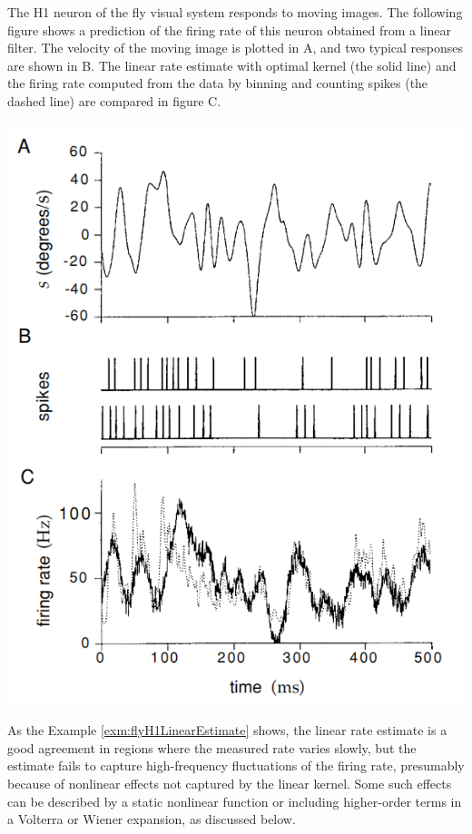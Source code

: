 \begin{exm}
  \label{exm:flyH1LinearEstimate}
  The H1 neuron of the fly visual system responds to moving images. The following figure shows a prediction of the firing rate of this neuron obtained from a linear filter. The velocity of the moving image is plotted in A, and two typical responses are shown in B. The linear rate estimate with optimal kernel (the solid line) and the firing rate computed from the data by binning and counting spikes (the dashed line) are compared in figure C.
  \begin{center}
    \includegraphics[scale=0.35]{./png/linearFilter}
  \end{center}
\end{exm}

\begin{rem}
  As the Example \ref{exm:flyH1LinearEstimate} shows, the linear rate estimate is a good agreement in regions where the measured rate varies slowly, but the estimate fails to capture high-frequency fluctuations of the firing rate, presumably because of nonlinear effects not captured by the linear kernel. Some such effects can be described by a static nonlinear function or including higher-order terms in a Volterra or Wiener expansion, as discussed below.
\end{rem}

